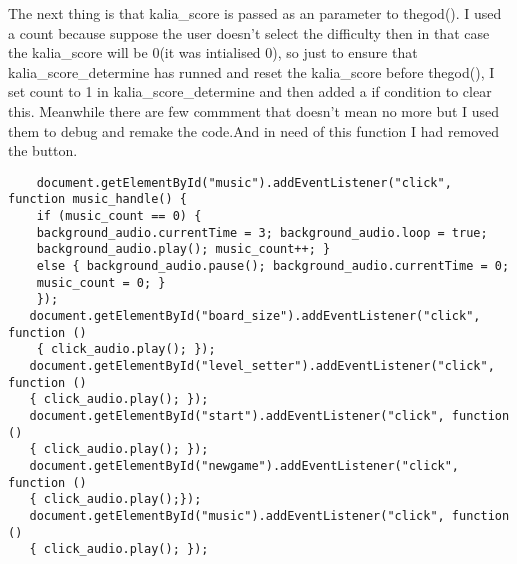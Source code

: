 \documentclass{article}
\begin{document}
\begin{flushleft}
\begin{enumerate}
    The next thing is that kalia\_score is passed as an parameter to thegod(). I used a count because suppose the user doesn't select the difficulty then in that case the kalia\_score will be 0(it was intialised 0), so just to ensure that kalia\_score\_determine has runned and reset the kalia\_score before thegod(), I set count to 1 in kalia\_score\_determine and then added a if condition to clear this.
    Meanwhile there are few commment that doesn't mean no more but I used them to debug and remake the code.And in need of this function I had removed the button.
    \begin{verbatim}
    document.getElementById("music").addEventListener("click", function music_handle() {
    if (music_count == 0) {
    background_audio.currentTime = 3; background_audio.loop = true; 
    background_audio.play(); music_count++; }
    else { background_audio.pause(); background_audio.currentTime = 0;
    music_count = 0; }
    });
   document.getElementById("board_size").addEventListener("click", function () 
    { click_audio.play(); });
   document.getElementById("level_setter").addEventListener("click", function () 
   { click_audio.play(); });
   document.getElementById("start").addEventListener("click", function () 
   { click_audio.play(); });
   document.getElementById("newgame").addEventListener("click", function () 
   { click_audio.play();});
   document.getElementById("music").addEventListener("click", function () 
   { click_audio.play(); });


\end{verbatim}
\end{enumerate}
\end{flushleft}
\end{document}
